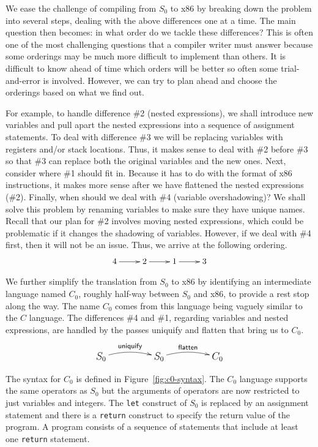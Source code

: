 \documentclass[12pt]{book}
\newcommand{\key}[1]{\texttt{#1}}
\begin{document}
We ease the challenge of compiling from $S_0$ to x86 by breaking down
the problem into several steps, dealing with the above differences one
at a time. The main question then becomes: in what order do we tackle
these differences? This is often one of the most challenging questions
that a compiler writer must answer because some orderings may be much
more difficult to implement than others. It is difficult to know ahead
of time which orders will be better so often some trial-and-error is
involved. However, we can try to plan ahead and choose the orderings
based on what we find out.

For example, to handle difference \#2 (nested expressions), we shall
introduce new variables and pull apart the nested expressions into a
sequence of assignment statements.  To deal with difference \#3 we
will be replacing variables with registers and/or stack
locations. Thus, it makes sense to deal with \#2 before \#3 so that
\#3 can replace both the original variables and the new ones. Next,
consider where \#1 should fit in. Because it has to do with the format
of x86 instructions, it makes more sense after we have flattened the
nested expressions (\#2). Finally, when should we deal with \#4
(variable overshadowing)?  We shall solve this problem by renaming
variables to make sure they have unique names. Recall that our plan
for \#2 involves moving nested expressions, which could be problematic
if it changes the shadowing of variables. However, if we deal with \#4
first, then it will not be an issue.  Thus, we arrive at the following
ordering.
\[
\xymatrix{
4 \ar[r] & 2 \ar[r] & 1 \ar[r] & 3
}
\]

We further simplify the translation from $S_0$ to x86 by identifying
an intermediate language named $C_0$, roughly half-way between $S_0$
and x86, to provide a rest stop along the way. The name $C_0$ comes
from this language being vaguely similar to the $C$ language. The
differences \#4 and \#1, regarding variables and nested expressions,
are handled by the passes \textsf{uniquify} and \textsf{flatten} that
bring us to $C_0$.
\[\large
\xymatrix@=50pt{
  S_0 \ar@/^/[r]^-{\textsf{uniquify}} & 
  S_0 \ar@/^/[r]^-{\textsf{flatten}} &
  C_0 
}
\]

The syntax for $C_0$ is defined in Figure~\ref{fig:c0-syntax}.  The
$C_0$ language supports the same operators as $S_0$ but the arguments
of operators are now restricted to just variables and integers. The
\key{let} construct of $S_0$ is replaced by an assignment statement
and there is a \key{return} construct to specify the return value of
the program. A program consists of a sequence of statements that
include at least one \key{return} statement.
\end{document}
